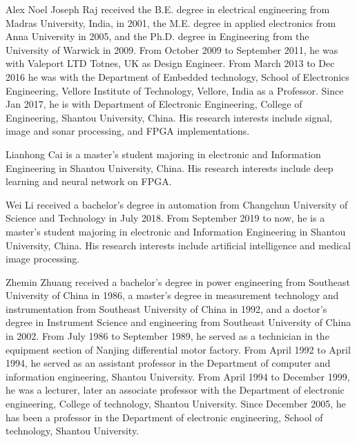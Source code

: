 \documentclass[journal]{IEEEtran}
\begin{document}
\begin{IEEEbiography}{Alex Noel Joseph Raj} received the B.E. degree in electrical engineering from Madras University, India, in 2001, the M.E. degree in applied electronics from Anna University in 2005, and the Ph.D. degree in Engineering from the University of Warwick in 2009. From October 2009 to September 2011, he was with Valeport LTD Totnes, UK as Design Engineer. From March 2013 to Dec 2016 he was with the Department of Embedded technology, School of Electronics Engineering, Vellore Institute of Technology, Vellore, India as a Professor. Since Jan 2017, he is with Department of Electronic Engineering, College of Engineering, Shantou University, China.  His research interests include signal, image and sonar processing, and FPGA implementations.
\end{IEEEbiography}
\vspace{1 mm}
\begin{IEEEbiography}{Lianhong Cai} is a master's student majoring in electronic and Information Engineering in Shantou University, China. His research interests include deep learning and neural network on FPGA. 
\end{IEEEbiography}
\vspace{1 mm}
\begin{IEEEbiography}{Wei Li} received a bachelor's degree in automation from Changchun University of Science and Technology in July 2018. From September 2019 to now, he is a master's student majoring in electronic and Information Engineering in Shantou University, China. His research interests include artificial intelligence and medical image processing.
\end{IEEEbiography}
\vspace{1 mm}
\begin{IEEEbiography}{Zhemin Zhuang} received a bachelor's degree in power engineering from Southeast University of China in 1986, a master's degree in measurement technology and instrumentation from Southeast University of China in 1992, and a doctor's degree in Instrument Science and engineering from Southeast University of China in 2002. From July 1986 to September 1989, he served as a technician in the equipment section of Nanjing differential motor factory. From April 1992 to April 1994, he served as an assistant professor in the Department of computer and information engineering, Shantou University. From April 1994 to December 1999, he was a lecturer, later an associate professor with the Department of electronic engineering, College of technology, Shantou University. Since December 2005, he has been a professor in the Department of electronic engineering, School of technology, Shantou University.
\end{IEEEbiography}
\end{document}
